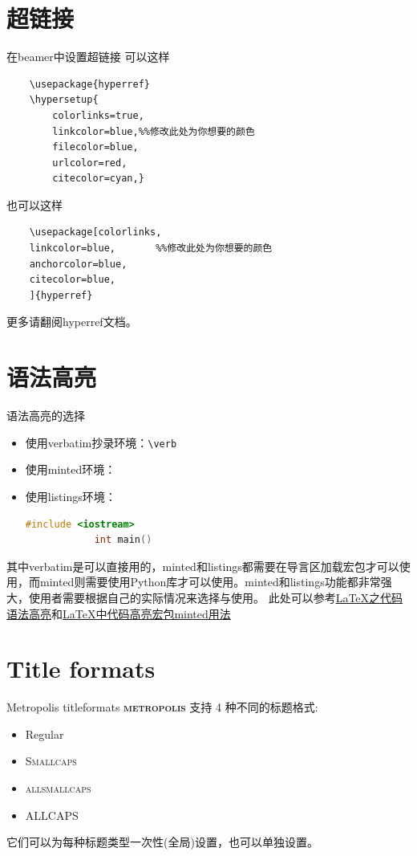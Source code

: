 \documentclass[10pt,UTF8]{ctexbeamer}
\newcommand{\themename}{\textbf{\textsc{metropolis}}\xspace}
\begin{document}
\section{超链接}
\begin{frame}[fragile]{在beamer中设置超链接}
	可以这样
\begin{verbatim}
	\usepackage{hyperref}
	\hypersetup{
		colorlinks=true,
		linkcolor=blue,%%修改此处为你想要的颜色
		filecolor=blue,      
		urlcolor=red,
		citecolor=cyan,}
\end{verbatim}
也可以这样
\begin{verbatim}
	\usepackage[colorlinks,
	linkcolor=blue,       %%修改此处为你想要的颜色
	anchorcolor=blue,  
	citecolor=blue,       
	]{hyperref}
\end{verbatim}
更多请翻阅hyperref文档。
\end{frame}

\section{语法高亮}
\begin{frame}[fragile]{语法高亮的选择}
	\begin{itemize}
		\item 使用verbatim抄录环境：\verb|\verb|
		
		\item 使用minted环境：
		
		\item 使用listings环境：
		\begin{lstlisting}[language=c++]
			#include <iostream>
			int main()
		\end{lstlisting}
	\end{itemize}
其中verbatim是可以直接用的，minted和listings都需要在导言区加载宏包才可以使用，而minted则需要使用Python库才可以使用。minted和listings功能都非常强大，使用者需要根据自己的实际情况来选择与使用。
此处可以参考\href{https://www.latexstudio.net/archives/5900.html}{LaTeX之代码语法高亮}和\href{https://blog.csdn.net/xenonhu/article/details/88978672}{LaTeX中代码高亮宏包minted用法}
\end{frame}
\section{Title formats}

\begin{frame}{Metropolis titleformats}
	\themename 支持 4 种不同的标题格式:
	\begin{itemize}
		\item Regular
		\item \textsc{Smallcaps}
		\item \textsc{allsmallcaps}
		\item ALLCAPS
	\end{itemize}
	它们可以为每种标题类型一次性(全局)设置，也可以单独设置。
\end{frame}
\end{document}
